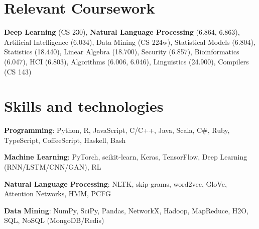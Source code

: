\documentclass[margin,line]{resume}
\begin{document}
\begin{resume}
\vspace{-6.5mm}

\section{\mysidestyle Relevant Coursework}

\textbf{Deep Learning} (CS 230), \textbf{Natural Language Processing} (6.864, 6.863), Artificial Intelligence (6.034), Data Mining (CS 224w), Statistical Models (6.804), Statistics (18.440), Linear Algebra (18.700), Security (6.857), Bioinformatics (6.047), HCI (6.803), Algorithms (6.006, 6.046), Linguistics (24.900), Compilers (CS 143)\\

\vspace{-6mm}

\section{\mysidestyle Skills and technologies}

\textbf{Programming}: Python, R, JavaScript, C/C++, Java, Scala, C\#, Ruby, TypeScript, CoffeeScript, Haskell, Bash

\vspace{-4mm}

\textbf{Machine Learning}: PyTorch, scikit-learn, Keras, TensorFlow, Deep Learning (RNN/LSTM/CNN/GAN), RL %

\vspace{-4mm}

\textbf{Natural Language Processing}: NLTK, skip-grams, word2vec, GloVe, Attention Networks, HMM, PCFG %


\vspace{-4mm}


\textbf{Data Mining}: NumPy, SciPy, Pandas, NetworkX, Hadoop, MapReduce, H2O, SQL, NoSQL (MongoDB/Redis) %


\end{resume}
\end{document}
